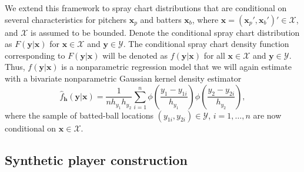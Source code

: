 \documentclass[12pt]{article}
\newcommand{\Y}{\mathcal{Y}}
\newcommand{\X}{\mathcal{X}}
\newcommand{\y}{\textbf{y}}
\newcommand{\x}{\textbf{x}}
\newcommand{\h}{\textbf{h}}
\begin{document}
We extend this framework to spray chart distributions that are conditional on several characteristics for pitchers $\x_p$ and batters $\x_b$, where $\x = (\x_p',\x_b')' \in \X$, and $\X$ is assumed to be bounded. Denote the conditional spray chart distribution as $F(\y|\x)$ for $\x \in \X$ and $\y \in \Y$. The conditional spray chart density function corresponding to $F(\y|\x)$ will be denoted as $f(\y|\x)$ for all $\x \in \X$ and $\y \in \Y$. Thus, $f(\y|\x)$ is a nonparametric regression model that we will again estimate with a bivariate nonparametric Gaussian kernel density estimator
\begin{equation} \label{spraydens-cov}
  \hat f_\h(\y|\x) =
    \frac{1}{n h_{y_1}h_{y_2}}\sum_{i=1}^{n} \phi\left(\frac{y_1 - y_{1i}}{h_{y_1}}\right)
      \phi\left(\frac{y_2 - y_{2i}}{h_{y_2}}\right),
\end{equation}
where the sample of batted-ball locations $(y_{1i},y_{2i}) \in \Y$, $i = 1, \ldots, n$ are now conditional on $\x \in \X$.


\subsection{Synthetic player construction}
\end{document}
